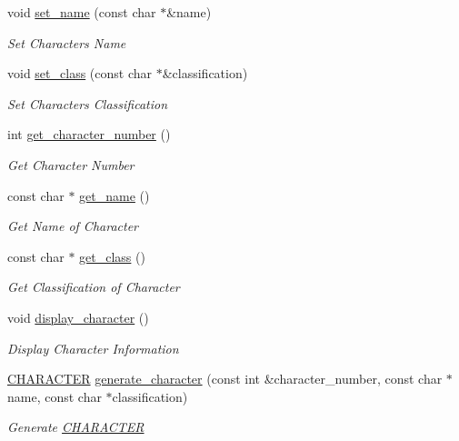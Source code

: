 \begin{DoxyCompactItemize}
void \mbox{\hyperlink{class_c_h_a_r_a_c_t_e_r_aa00c4039fd3fed8620fbf200bfbe2cca}{set\+\_\+name}} (const char $\ast$\&name)
\begin{DoxyCompactList}\small\item\em Set Character\textquotesingle{}s Name \end{DoxyCompactList}\item 
void \mbox{\hyperlink{class_c_h_a_r_a_c_t_e_r_a926e6b6d0d3365e82c889c346904bb9f}{set\+\_\+class}} (const char $\ast$\&classification)
\begin{DoxyCompactList}\small\item\em Set Character\textquotesingle{}s Classification \end{DoxyCompactList}\item 
int \mbox{\hyperlink{class_c_h_a_r_a_c_t_e_r_a4bcf200b95bdbd7dd1bee5779acc8d96}{get\+\_\+character\+\_\+number}} ()
\begin{DoxyCompactList}\small\item\em Get Character Number \end{DoxyCompactList}\item 
const char $\ast$ \mbox{\hyperlink{class_c_h_a_r_a_c_t_e_r_af6adb3c39e4d88546e976e99245264a1}{get\+\_\+name}} ()
\begin{DoxyCompactList}\small\item\em Get Name of Character \end{DoxyCompactList}\item 
const char $\ast$ \mbox{\hyperlink{class_c_h_a_r_a_c_t_e_r_a82245a7d6d0c452402071dbea8d74171}{get\+\_\+class}} ()
\begin{DoxyCompactList}\small\item\em Get Classification of Character \end{DoxyCompactList}\item 
void \mbox{\hyperlink{class_c_h_a_r_a_c_t_e_r_a49b688dd97468943d50a34c68b1a21e9}{display\+\_\+character}} ()
\begin{DoxyCompactList}\small\item\em Display Character Information \end{DoxyCompactList}\item 
\mbox{\hyperlink{class_c_h_a_r_a_c_t_e_r}{C\+H\+A\+R\+A\+C\+T\+ER}} \mbox{\hyperlink{class_c_h_a_r_a_c_t_e_r_a1992d1ec96d7aea60371d41f5afa0d0d}{generate\+\_\+character}} (const int \&character\+\_\+number, const char $\ast$name, const char $\ast$classification)
\begin{DoxyCompactList}\small\item\em Generate \mbox{\hyperlink{class_c_h_a_r_a_c_t_e_r}{C\+H\+A\+R\+A\+C\+T\+ER}} \end{DoxyCompactList}\item 

\end{DoxyCompactItemize}
